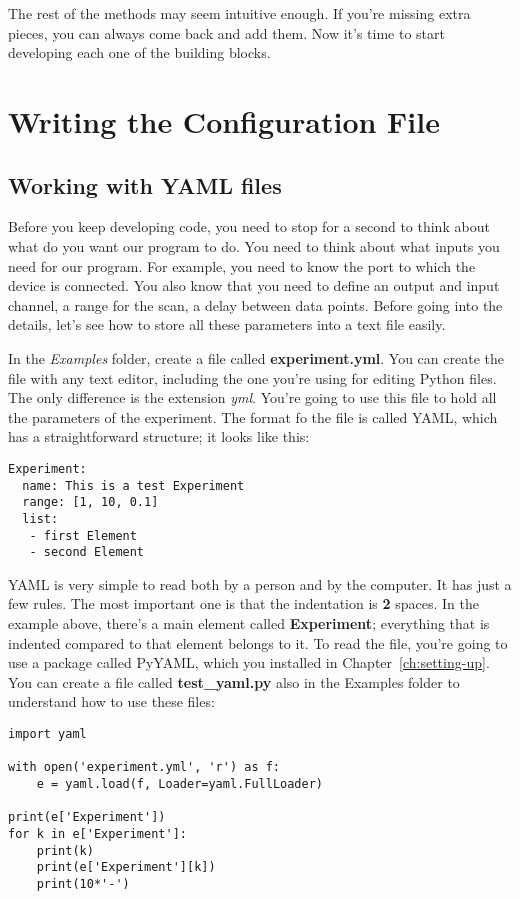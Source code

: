 The rest of the methods may seem intuitive enough. If you're missing extra pieces, you can always come back and add them. Now it's time to start developing each one of the building blocks.

\section{Writing the Configuration File}\label{sec:configuration-file}
\subsection{Working with YAML files}\label{subsec:yaml-files}
Before you keep developing code, you need to stop for a second to think about what do you want our program to do. You need to think about what inputs you need for our program. For example, you need to know the port to which the device is connected. You also know that you need to define an output and input channel, a range for the scan, a delay between data points. Before going into the details, let's see how to store all these parameters into a text file easily.

In the \emph{Examples} folder, create a file called \textbf{experiment.yml}. You can create the file with any text editor, including the one you're using for editing Python files. The only difference is the extension \emph{yml}. You're going to use this file to hold all the parameters of the experiment. The format fo the file is called {YAML}, which has a straightforward structure; it looks like this:

\begin{verbatim}
Experiment:
  name: This is a test Experiment
  range: [1, 10, 0.1]
  list:
   - first Element
   - second Element
\end{verbatim}

{YAML} is very simple to read both by a person and by the computer. It has just a few rules. The most important one is that the indentation is \textbf{2} spaces. In the example above, there's a main element called \textbf{Experiment}; everything that is indented compared to that element belongs to it. To read the file, you're going to use a package called PyYAML, which you installed in Chapter~\ref{ch:setting-up}. You can create a file called \textbf{test\_yaml.py} also in the Examples folder to understand how to use these files:

\begin{verbatim}
import yaml

with open('experiment.yml', 'r') as f:
    e = yaml.load(f, Loader=yaml.FullLoader)

print(e['Experiment'])
for k in e['Experiment']:
    print(k)
    print(e['Experiment'][k])
    print(10*'-')
\end{verbatim}

